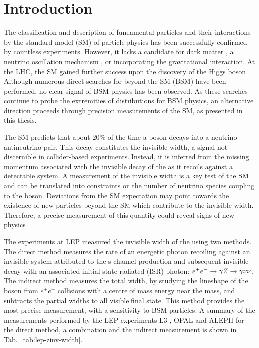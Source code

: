 \chapter{Introduction}
\label{chap:introduction}


The classification and description of fundamental particles and their interactions by the standard model (SM) of particle physics has been successfully confirmed by countless experiments. However, it lacks a candidate for dark matter \cite{Ade:2015xua,Corbelli:1999af}, a neutrino oscillation mechanism \cite{Fukuda:1998ah,Ahmad:2002jz,Eguchi:2002dm}, or incorporating the gravitational interaction. At the LHC, the SM gained further success upon the discovery of the Higgs boson \cite{Aad:1471031,Chatrchyan:1471016}. Although numerous direct searches for beyond the SM (BSM) have been performed, no clear signal of BSM physics has been observed. As these searches continue to probe the extremities of distributions for BSM physics, an alternative direction proceeds through precision measurements of the SM, as presented in this thesis.

The SM predicts that about $20\%$ \cite{PhysRevD.98.030001} of the time a \PZ boson decays into a neutrino-antineutrino pair. This decay constitutes the \PZ invisible width, a signal not discernible in collider-based experiments.  Instead, it is inferred from the missing momentum associated with the invisible decay of the \PZ as it recoils against a detectable system. A measurement of the \PZ invisible width is a key test of the SM and can be translated into constraints on the number of neutrino species coupling to the \PZ boson. Deviations from the SM expectation may point towards the existence of new particles beyond the SM which contribute to the \PZ invisible width. Therefore, a precise measurement of this quantity could reveal signs of new physics

The experiments at LEP measured the invisible width of the \PZ using two methods. The direct method measures the rate of an energetic photon recoiling against an invisible system attributed to the s-channel \PZ production and subsequent invisible decay with an associated initial state radiated (ISR) photon: $e^+e^-\rightarrow \gamma Z \rightarrow \gamma\nu\bar{\nu}$. The indirect method measures the total \PZ width, by studying the lineshape of the \PZ boson from $e^+e^-$ collisions with a centre of mass energy near the \PZ mass, and subtracts the partial widths to all visible final state. This method provides the most precise measurement, with a sensitivity to BSM particles. A summary of the measurements performed by the LEP experiments L3 \cite{Acciarri:1998vf}, OPAL \cite{Akers:1994vh} and ALEPH \cite{Buskulic:1993ke} for the direct method, a combination and the indirect measurement is shown in Tab.~\ref{tab:lep-zinv-width}.

